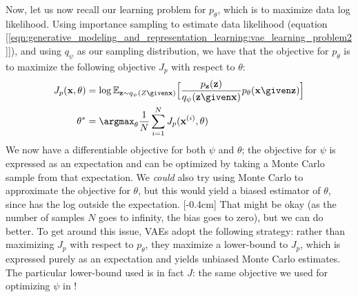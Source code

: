 Now, let us now recall our learning problem for $p_{\theta}$, which is to maximize data log likelihood. Using importance sampling to estimate data likelihood (equation [\ref{eqn:generative_modeling_and_representation_learning:vae_learning_problem2}]), and using $q_{\psi}$ as our sampling distribution, we have that the objective for $p_{\theta}$ is to maximize the following objective $J_p$ with respect to $\theta$:
\begin{align}
    J_p(\mathbf{x},\theta) &= \log \mathbb{E}_{\mathbf{z}\sim q_{\psi}(Z \given \mathbf{x})}\Big[\frac{p_{\mathbf{z}}(\mathbf{z})}{q_{\psi}(\mathbf{z} \given \mathbf{x})} p_{\theta}(\mathbf{x} \given \mathbf{z})\Big] \label{eqn:generative_modeling_and_representation_learning:J_p}\\
    \theta^* &= \argmax_{\theta} \frac{1}{N}\sum_{i=1}^N J_p(\mathbf{x}^{(i)}, \theta)
\end{align}
We now have a differentiable objective for both $\psi$ and $\theta$; the objective for $\psi$ is expressed as an expectation and can be optimized by taking a Monte Carlo sample from that expectation. We \textit{could} also try using Monte Carlo to approximate the objective for $\theta$, but this would yield a biased estimator of $\theta$, since \eqn{\ref{eqn:generative_modeling_and_representation_learning:J_p}} has the log outside the expectation. [-0.4cm]
That might be okay (as the number of samples $N$ goes to infinity, the bias goes to zero), but we can do better. To get around this issue, VAEs adopt the following strategy: rather than maximizing $J_p$ with respect to $p_{\theta}$, they maximize a lower-bound to $J_p$, which is expressed purely as an expectation and yields unbiased Monte Carlo estimates. The particular lower-bound used is in fact $J$: the same objective we used for optimizing $\psi$ in \eqn{\ref{eqn:generative_modeling_and_representation_learning:J_q}}! 

